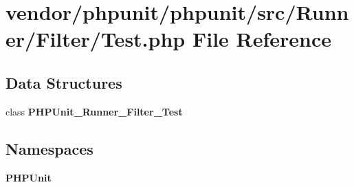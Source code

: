 \section{vendor/phpunit/phpunit/src/\+Runner/\+Filter/\+Test.php File Reference}
\label{_runner_2_filter_2_test_8php}
\subsection*{Data Structures}
\begin{DoxyCompactItemize}
\item 
class {\bf P\+H\+P\+Unit\+\_\+\+Runner\+\_\+\+Filter\+\_\+\+Test}
\end{DoxyCompactItemize}
\subsection*{Namespaces}
\begin{DoxyCompactItemize}
\item 
 {\bf P\+H\+P\+Unit}
\end{DoxyCompactItemize}
